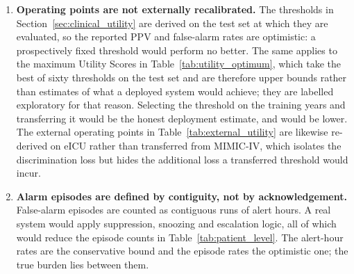 \begin{enumerate}
    \item \textbf{Operating points are not externally recalibrated.} The
    thresholds in Section~\ref{sec:clinical_utility} are derived on the test
    set at which they are evaluated, so the reported PPV and false-alarm rates
    are optimistic: a prospectively fixed threshold would perform no better.
    The same applies to the maximum Utility Scores in
    Table~\ref{tab:utility_optimum}, which take the best of sixty thresholds on
    the test set and are therefore upper bounds rather than estimates of what a
    deployed system would achieve; they are labelled exploratory for that
    reason. Selecting the threshold on the training years and transferring it
    would be the honest deployment estimate, and would be lower.
    The external operating points in Table~\ref{tab:external_utility} are
    likewise re-derived on eICU rather than transferred from MIMIC-IV, which
    isolates the discrimination loss but hides the additional loss a
    transferred threshold would incur.

    \item \textbf{Alarm episodes are defined by contiguity, not by
    acknowledgement.} False-alarm episodes are counted as contiguous runs of
    alert hours. A real system would apply suppression, snoozing and
    escalation logic, all of which would reduce the episode counts in
    Table~\ref{tab:patient_level}. The alert-hour rates are the conservative
    bound and the episode rates the optimistic one; the true burden lies
    between them.


\end{enumerate}

